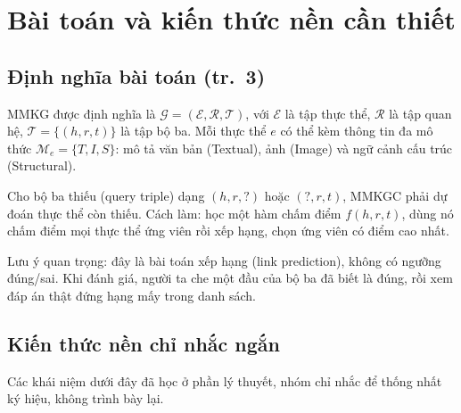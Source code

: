 \documentclass[11pt,a4paper]{article}
\begin{document}
\section{Bài toán và kiến thức nền cần thiết}

\subsection{Định nghĩa bài toán (tr.~3)}

MMKG được định nghĩa là $\mathcal{G} = (\mathcal{E}, \mathcal{R}, \mathcal{T})$, với $\mathcal{E}$ là tập thực thể, $\mathcal{R}$ là tập quan hệ, $\mathcal{T} = \{(h, r, t)\}$ là tập bộ ba. Mỗi thực thể $e$ có thể kèm thông tin đa mô thức $\mathcal{M}_e = \{T, I, S\}$: mô tả văn bản (Textual), ảnh (Image) và ngữ cảnh cấu trúc (Structural).

Cho bộ ba thiếu (query triple) dạng $(h, r, ?)$ hoặc $(?, r, t)$, MMKGC phải dự đoán thực thể còn thiếu. Cách làm: học một hàm chấm điểm $f(h, r, t)$, dùng nó chấm điểm mọi thực thể ứng viên rồi xếp hạng, chọn ứng viên có điểm cao nhất.

Lưu ý quan trọng: đây là bài toán xếp hạng (link prediction), không có ngưỡng đúng/sai. Khi đánh giá, người ta che một đầu của bộ ba đã biết là đúng, rồi xem đáp án thật đứng hạng mấy trong danh sách.

\subsection{Kiến thức nền chỉ nhắc ngắn}

Các khái niệm dưới đây đã học ở phần lý thuyết, nhóm chỉ nhắc để thống nhất ký hiệu, không trình bày lại.
\end{document}
